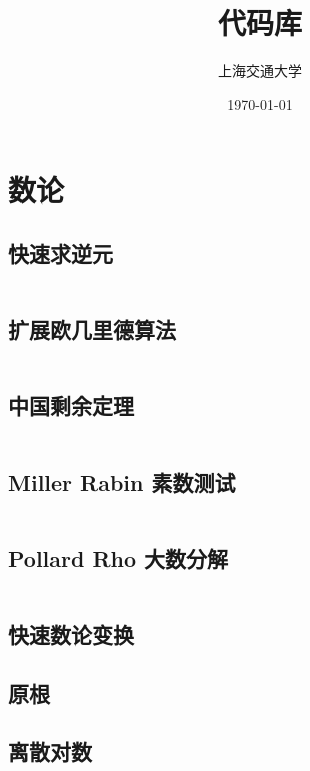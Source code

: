 \documentclass[a4paper]{article}
\title{代码库}
\author{上海交通大学}
\date{\today}
\newcommand{\cppcode}[1]{
    \inputminted[mathescape]{cpp}{source/#1}
}
\begin{document}
\maketitle

\tableofcontents

\clearpage

\section{数论}

\subsection{快速求逆元}

\cppcode{number-theory/inverse.cpp}

\subsection{扩展欧几里德算法}

\cppcode{number-theory/extended-euclid.cpp}

\subsection{中国剩余定理}

\cppcode{number-theory/chinese-remainder-theorem.cpp}

\subsection{Miller Rabin 素数测试}

\cppcode{number-theory/miller-rabin.cpp}

\subsection{Pollard Rho 大数分解}

\cppcode{number-theory/pollard-rho.cpp}

\subsection{快速数论变换}

\subsection{原根}

\subsection{离散对数}
\end{document}
